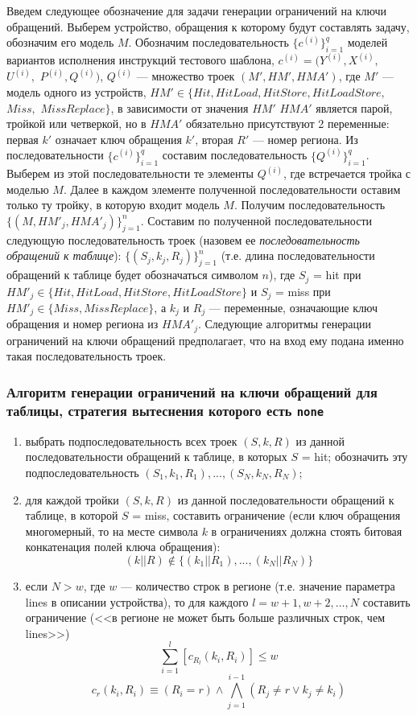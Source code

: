 Введем следующее обозначение для задачи генерации ограничений на ключи обращений. Выберем устройство, обращения к которому будут составлять задачу, обозначим его модель $M$. Обозначим  последовательность $\{c^{(i)}\}_{i=1}^q$ моделей вариантов исполнения инструкций тестового шаблона, $c^{(i)} = (Y^{(i)}, X^{(i)},$ $U^{(i)},$ $P^{(i)}, Q^{(i)})$, $Q^{(i)}$ --- множество троек $(M', HM', HMA')$, где $M'$ --- модель одного из устройств, $HM' \in \{Hit, HitLoad, HitStore, HitLoadStore,$ $Miss,$ $MissReplace\}$, в зависимости от значения $HM'$ $HMA'$ является парой, тройкой или четверкой, но в $HMA'$ обязательно присутствуют 2 переменные: первая $k'$ означает ключ обращения $k'$, вторая $R'$ --- номер региона. Из последовательности $\{c^{(i)}\}_{i=1}^q$ составим последовательность $\{Q^{(i)}\}_{i=1}^q$. Выберем из этой последовательности те элементы $Q^{(i)}$, где встречается тройка с моделью $M$. Далее в каждом элементе полученной последовательности оставим только ту тройку, в которую входит модель $M$. Получим последовательность $\{(M, HM'_j, HMA'_j)\}_{j=1}^n$. Составим по полученной последовательности следующую последовательность троек (назовем ее \emph{последовательность обращений к таблице}): $\{(S_j, k_j, R_j)\}_{j=1}^n$ (т.е. длина последовательности обращений к таблице будет обозначаться символом $n$), где $S_j$ = hit при $HM'_j \in \{Hit, HitLoad, HitStore, HitLoadStore\}$ и $S_j$ = miss при $HM'_j \in \{Miss, MissReplace\}$, а $k_j$ и $R_j$ --- переменные, означающие ключ обращения и номер региона из $HMA'_j$. Следующие алгоритмы генерации ограничений на ключи обращений предполагает, что на вход ему подана именно такая последовательность троек.

\subsubsection*{Алгоритм генерации ограничений на ключи обращений для таблицы, стратегия вытеснения которого есть \texttt{none}}

\begin{enumerate}
    \item выбрать подпоследовательность всех троек $(S, k, R)$ из данной последовательности обращений к таблице, в которых $S$ = hit; обозначить эту подпоследовательность $(S_1, k_1, R_1), ..., (S_N, k_N, R_N)$;
    \item для каждой тройки $(S, k, R)$ из данной последовательности обращений к таблице, в которой $S$ = miss, составить ограничение (если ключ обращения многомерный, то на месте символа $k$ в ограничениях должна стоять битовая конкатенация полей ключа обращения): $$(k||R) \notin \{(k_1||R_1), ..., (k_N||R_N)\}$$
    \item если $N > w$, где $w$ --- количество строк в регионе (т.е. значение параметра lines в описании устройства), то для каждого $l = w+1, w+2, \dots, N$ составить ограничение (<<в регионе не может быть больше различных строк, чем lines>>)
$$\sum_{i=1}^l [c_{R_l} (k_i, R_i)] \leqslant w$$
$$c_r (k_i, R_i) \equiv (R_i = r) \wedge \bigwedge_{j=1}^{i-1} (R_j \neq r \vee k_j \neq k_i)$$
\end{enumerate}

